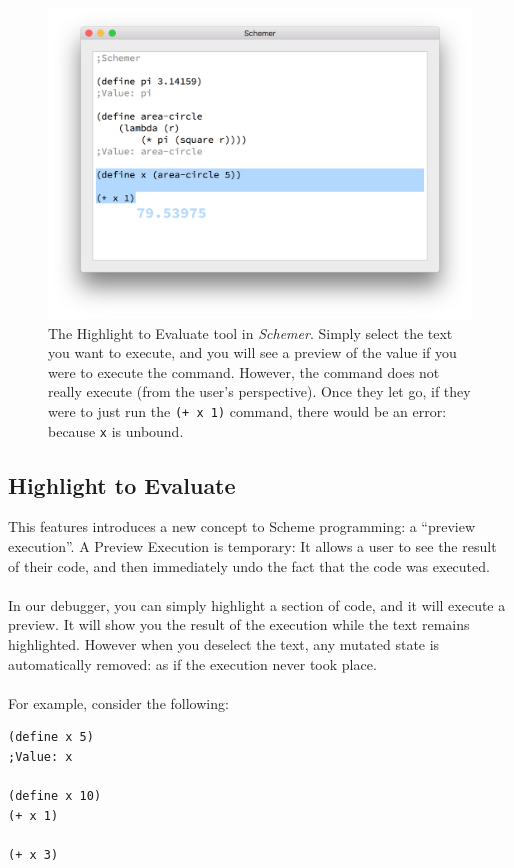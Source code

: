 \documentclass[10pt,journal,compsoc]{IEEEtran}
\begin{document}
	    \begin{figure}
            \includegraphics[width=\linewidth]{preview-2.png}
            \caption{The Highlight to Evaluate tool in \emph{Schemer}. Simply select the text you want to execute, and you will see a preview of the value if you were to execute the command. However, the command does not really execute (from the user's perspective). Once they let go, if they were to just run the \lstinline{(+ x 1)} command, there would be an error: because \lstinline{x} is unbound.}
            \label{fig:overview}
        \end{figure}
	    
	    
	    \subsection{Highlight to Evaluate}
	    
	    This features introduces a new concept to Scheme programming: a “preview execution”. A Preview Execution is temporary: It allows a user to see the result of their code, and then immediately undo the fact that the code was executed.\\
	    \\
        In our debugger, you can simply highlight a section of code, and it will execute a preview. It will show you the result of the execution while the text remains highlighted. However when you deselect the text, any mutated state is automatically removed: as if the execution never took place.\\
        \\
        For example, consider the following:
        \begin{lstlisting}[frame=single]
(define x 5)
;Value: x

(define x 10)
(+ x 1)

(+ x 3)
        \end{lstlisting}
        
\end{document}
